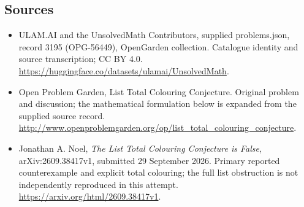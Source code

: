 \documentclass[11pt,a4paper]{article}
\begin{document}
\subsection{Sources}
\begin{itemize}
\item[S1] ULAM.AI and the UnsolvedMath Contributors, supplied problems.json, record 3195 (OPG-56449), OpenGarden collection. Catalogue identity and source transcription; CC BY 4.0.
\url{https://huggingface.co/datasets/ulamai/UnsolvedMath}.
\item[S2] Open Problem Garden, List Total Colouring Conjecture. Original problem and discussion; the mathematical formulation below is expanded from the supplied source record.
\url{http://www.openproblemgarden.org/op/list_total_colouring_conjecture}.
\item[S3] Jonathan A. Noel, \emph{The List Total Colouring Conjecture is False}, arXiv:2609.38417v1, submitted 29 September 2026. Primary reported counterexample and explicit total colouring; the full list obstruction is not independently reproduced in this attempt.
\url{https://arxiv.org/html/2609.38417v1}.
\end{itemize}
\end{document}
